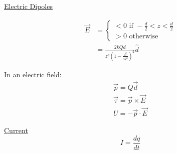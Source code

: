 \documentclass[8pt]{minimal}
\begin{document}
\underline{Electric Dipoles}

\begin{align*}
    \vec{E} &= \left\{ \begin{matrix}
        < 0 \text{ if } -\frac{d}{2} < z < \frac{d}{2}\\
        > 0 \text{ otherwise}
    \end{matrix} \right.\\
        &=  \frac{2kQd}{z^3\left(1 - \frac{d^2}{4z^2}\right)^2}\hat{d}
\end{align*}

In an electric field:
\begin{gather*}
    \vec{p} = Q\vec{d}\\
    \vec{\tau} = \vec{p} \times \vec{E}\\
    U = -\vec{p} \cdot \vec{E}
\end{gather*}


\underline{Current}
\[ I = \frac{dq}{dt} \]
\end{document}
